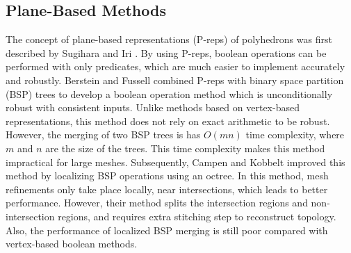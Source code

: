 \subsection{Plane-Based Methods}
\label{sec:pbrelated}

The concept of plane-based representations (P-reps) of polyhedrons was first described by Sugihara and Iri \cite{sugihara1990solid}. By using P-reps, boolean operations can be performed with only predicates, which are much easier to implement accurately and robustly. Berstein and Fussell \cite{bernstein2009fast} combined P-reps with binary space partition (BSP) trees \cite{thibault1987set,naylor1990merging} to develop a boolean operation method which is unconditionally robust with consistent inputs. Unlike methods based on vertex-based representations, this method does not rely on exact arithmetic to be robust.
However, the merging of two BSP trees is has $O(mn)$ time complexity, where $m$ and $n$ are the size of the trees. This time complexity makes this method impractical for large meshes. Subsequently, Campen and Kobbelt \cite{campen2010exact} improved this method by localizing BSP operations using an octree. In this method, mesh refinements only take place locally, near intersections, which leads to better performance. However, their method splits the intersection regions and non-intersection regions, and requires extra stitching step to reconstruct topology. Also, the performance of localized BSP merging is still poor compared with vertex-based boolean methods.
